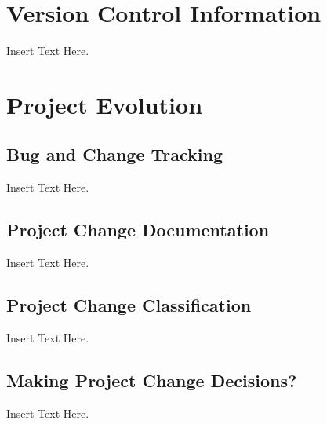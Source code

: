 \documentclass [12pt]{article}
\begin{document}





\section{Version Control Information}
Insert Text Here. 






\section{Project Evolution}

\subsection{Bug and Change Tracking}
Insert Text Here. 

\subsection{Project Change Documentation}
Insert Text Here.

\subsection{Project Change Classification}
Insert Text Here.

\subsection{Making Project Change Decisions?} 
Insert Text Here.


\end{document}
